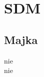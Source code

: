 \documentclass{report}
\begin{document}
\newenvironment{chorus}{\begin{adjustwidth}{2cm}{}}{\end{adjustwidth}}


\renewcommand{\contentsname}{Spis treści}
\tableofcontents
\chapter*{SDM}
\section*{Majka}
\begin{paracol}{2}
nie\\

\switchcolumn
nie\\

\end{paracol}
\newpage
\end{document}
